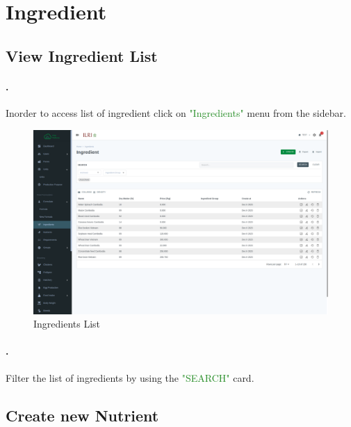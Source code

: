 \section{Ingredient}\label{sec:ingredient}

\subsection{View Ingredient List}\label{sec:ingredient_list}
\setcounter{stepcounter}{1}
\paragraph{.} Inorder to access list of ingredient click on \textcolor{ForestGreen}{"Ingredients"} menu from the sidebar.
\begin{figure}[h!]
  	\includegraphics[width=15cm]{screenshots/ingredient_list_page.png}
  	\caption{Ingredients  List}
  	\label{fig:nutrient_list_page}
\end{figure}
\paragraph{.} Filter the list of ingredients by using the \textcolor{ForestGreen}{"SEARCH"} card.

\subsection{Create new Nutrient }\label{sec:ingredient_create}
\setcounter{stepcounter}{1}
